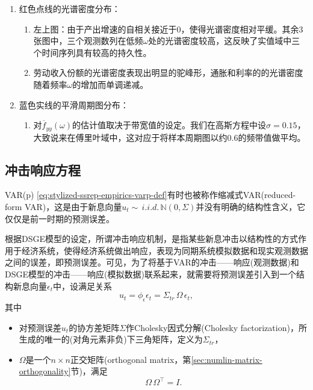 \begin{enumerate}
  \item 红色点线的光谱密度分布：
\begin{enumerate}
  \item 左上图：由于产出增速的自相关接近于$0$，使得光谱密度相对平缓。其余3张图中，三个观测数列在低频$\omega$处的光谱密度较高，这反映了实值域中三个时间序列具有较高的持久性。
  \item 劳动收入份额的光谱密度表现出明显的驼峰形，通胀和利率的的光谱密度随着频率$\omega$的增加而单调递减。
\end{enumerate}
\item 蓝色实线的平滑周期图分布：
\begin{enumerate}
  \item 对$\overline{f}_{yy} \left( \omega \right)$的估计值取决于带宽值的设定。我们在高斯方程中设$\sigma = 0.15$，大致说来在傅里叶域中，这对应于将样本周期图以约0.6的频带值做平均。
  \end{enumerate}
\end{enumerate}

\subsection{冲击响应方程}
\label{sec:stylized-ssrep-empirics-irfs}

VAR(p) \eqref{eq:stylized-ssrep-empirics-varp-def}有时也被称作缩减式VAR(reduced-form VAR)，这是由于新息向量$u_{t} \sim \, i.i.d. \, \mathbb{N} \left( 0, \Sigma \right)$并没有明确的结构性含义，它仅仅是前一时期的预测误差。

根据DSGE模型的设定，所谓冲击响应机制，是指某些新息冲击以结构性的方式作用于经济系统，使得经济系统做出响应，表现为同期系统模拟数据和现实观测数据之间的误差，即预测误差。可见，为了将基于VAR的冲击——响应(观测数据)和DSGE模型的冲击——响应(模拟数据)联系起来，就需要将预测误差引入到一个结构新息向量$\epsilon_{t}$中，设满足关系
\begin{equation}
  \label{eq:stylized-ssrep-svar-forecast-error}
  u_{t} = \phi_{\epsilon} \epsilon_{t} = \Sigma_{tr} \, \Omega \, \epsilon_{t},
\end{equation}
其中
\begin{itemize}
\item 对预测误差$u_{t}$的协方差矩阵$\Sigma$作Cholesky因式分解(Cholesky factorization)，所生成的唯一的(对角元素非负)下三角矩阵，定义为$\Sigma_{tr}$，
\item $\Omega$是一个$n \times n$正交矩阵(orthogonal matrix，第\ref{sec:numlin-matrix-orthogonality}节)，满足
\begin{equation*}
  \Omega \, \Omega^{\top} = I.
\end{equation*}
\end{itemize}

